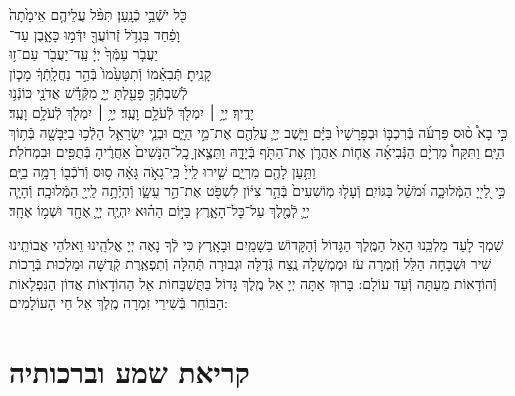 \documentclass[twoside, openany, parskip=half, 11pt]{book}
\begin{document}
כֹּ֖ל יֹשְֿׁבֵ֥י כְֿנָֽעַן׃ \hfill תִּפֹּ֨ל עֲלֵיהֶ֤ם אֵימָ֙תָה֙ \\
וָפַ֔חַד \hfill בִּגְדֹ֥ל זְֿרוֹעֲךָ֖ יִדְּֿמ֣וּ כָּאָ֑בֶן \hfill עַד־\\
יַעֲבֹ֤ר עַמְּֿךָ֙ יְיָ֔ \hfill עַֽד־יַעֲבֹ֖ר עַם־ז֥וּ \\
קָנִֽיתָ׃ \hfill תְּֿבִאֵ֗מוֹ וְֿתִטָּעֵ֙מוֹ֙ בְּֿהַ֣ר נַחֲלָֽתְֿךָ֔ \hfill מָכ֧וֹן \\
לְֿשִׁבְתְּֿֿךָ֛ פָּעַ֖לְתָּ יְיָ֑ \hfill מִקְּֿדָ֕שׁ אֲדֹנָ֖י כּוֹנְֿנ֥וּ \\
יָדֶֽיךָ׃ \hfill יְיָ֥ ׀ יִמְלֹ֖ךְ לְֿעֹלָ֥ם וָעֶֽד׃\hfill \break
יְיָ֥ ׀ יִמְלֹ֖ךְ לְֿעֹלָ֥ם וָעֶֽד׃\\
כִּ֣י בָא֩ ס֨וּס פַּרְעֹ֜ה בְּֿרִכְבּ֤וֹ וּבְפָרָשָׁיו֙ בַּיָּ֔ם וַיָּ֧שֶׁב יְיָ֛ עֲלֵהֶ֖ם אֶת־מֵ֣י הַיָּ֑ם וּבְנֵ֧י יִשְׂרָאֵ֛ל הָלְֿכ֥וּ בַיַּבָּשָׁ֖ה בְּֿת֥וֹךְ הַיָּֽם׃ וַתִּקַּח֩ מִרְיָ֨ם הַנְּֿבִיאָ֜ה אֲח֧וֹת אַהֲרֹ֛ן אֶת־הַתֹּ֖ף בְּֿיָדָ֑הּ וַתֵּצֶ֤אןָ כׇֽל־הַנָּשִׁים֙ אַחֲרֶ֔יהָ בְּֿתֻפִּ֖ים וּבִמְחֹלֹֽת׃ וַתַּ֥עַן לָהֶ֖ם מִרְיָ֑ם שִׁ֤ירוּ לַֽייָ֙ כִּֽי־גָאֹ֣ה גָּאָ֔ה ס֥וּס וְֿרֹכְֿב֖וֹ רָמָ֥ה בַיָּֽם׃
\\
כִּ֣י לַ֭ייָ֭ הַמְּֿלוּכָ֑ה וּ֝מֹשֵׁ֗ל בַּגּוֹיִֽם׃
וְֿעָל֤וּ מֽוֹשִׁעִים֙ בְּֿהַ֣ר צִיּ֔וֹן לִשְׁפֹּ֖ט אֶת־הַ֣ר עֵשָׂ֑ו וְֿהָיְֿתָ֥ה לַֽייָ֖ הַמְּֿלוּכָֽה׃
וְֿהָיָ֧ה יְיָ֛ לְֿמֶ֖לֶךְ עַל־כׇּל־הָאָ֑רֶץ בַּיּ֣וֹם הַה֗וּא יִהְיֶ֧ה יְיָ֛ אֶחָ֖ד וּשְׁמ֥וֹ אֶחָֽד׃



שִׁמְךָ לָעַד מַלְכֵּֽנוּ הָאֵל הַמֶּֽלֶךְ הַגָּדוֹל וְֿהַקָּדוֹשׁ בַּשָׁמַֽיִם וּבָאָֽרֶץ כִּי לְֿךָ נָאֶה יְיָ אֱלֹהֵֽינוּ וֵאלֹהֵי אֲבוֹתֵֽינוּ שִׁיר וּשְׁבָחָה הַלֵּל וְֿזִמְרָה עֹז וּמֶמְשָׁלָה נֶֽצַח גְּֿדֻלָּה וּגְבוּרָה תְּֿהִלָּה וְֿתִפְאֶֽרֶת קְֿדֻשָּׁה וּמַלְכוּת בְּֿרָכוֹת וְֿהוֹדָאוֹת מֵעַתָּה וְֿעַד עוֹלָם: בָּרוּךְ אַתָּה יְיָ אֵל מֶֽלֶךְ גָּדוֹל בַּתֻּשְׁבָּחוֹת אֵל הַהוֹדָאוֹת אֲדוֹן הַנִּפְלָאוֹת הַבּוֹחֵר בְּֿשִׁירֵי זִמְרָה מֶֽלֶךְ אֵל חַי הָעוֹלָמִים:

\halfkaddish

\enlargethispage{\baselineskip}

\vspace{1.25\baselineskip}
\section{קריאת שמע וברכותיה}
\end{document}
